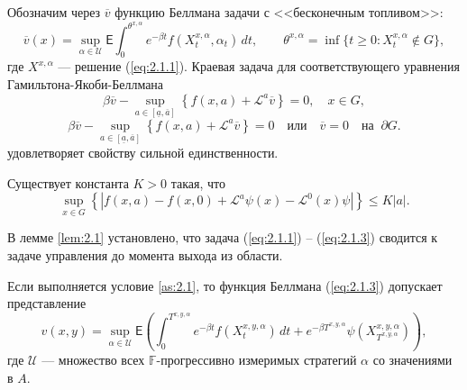 \begin{assumption} \label{as:2.2}
Обозначим через $\overline v$ функцию Беллмана задачи с <<бесконечным топливом>>:
\begin{equation} \label{eq:2.2.11}
\overline v(x)=\sup_{\alpha\in\mathcal U} \mathsf E\int_0^{\theta^{x,\alpha}} e^{-\beta t} f(X_t^{x,\alpha},\alpha_t)\,dt,
\qquad \theta^{x,\alpha}=\inf\{t\ge 0: X_t^{x,\alpha}\not \in G\},
\end{equation}
где $X^{x,\alpha}$ --- решение (\ref{eq:2.1.1}). Краевая задача для соответствующего уравнения Гамильтона-Якоби-Беллмана
\begin{equation} \label{eq:2.2.12}
\beta \overline v- \sup_{a \in [\underline a, \overline a]} \left\{f(x,a)+ \mathcal L^a \overline v \right\}=0,\quad x\in G,
\end{equation}
\begin{equation} \label{eq:2.2.13}
\beta \overline v- \sup_{a \in [\underline a, \overline a]} \left\{f(x,a)+ \mathcal L^a \overline v \right\}=0 \quad
\textrm{или}\quad \overline v=0\quad \textrm{на }\ \partial G.
\end{equation}
удовлетворяет свойству сильной единственности.
\end{assumption}
\begin{assumption} \label{as:2.3}
Существует константа $K>0$ такая, что
$$ \sup_{x\in G}\left\{|f(x,a)-f(x,0)+\mathcal L^a\psi(x)-\mathcal L^0(x)\psi|\right\}\le K|a|.$$
\end{assumption}
В лемме \ref{lem:2.1} установлено, что задача (\ref{eq:2.1.1}) -- (\ref{eq:2.1.3}) сводится к задаче управления до момента выхода из области.
\begin{lemma} \label{lem:2.1}
Если выполняется условие \ref{as:2.1}, то функция Беллмана (\ref{eq:2.1.3}) допускает представление
\begin{equation} \label{eq:2.2.6}
v(x,y)=\sup_{\alpha\in\mathcal U}\mathsf E\left(\int_0^{T^{x,y,\alpha}} e^{-\beta t} f(X_t^{x,y,\alpha})\,dt+e^{-\beta T^{x,y,\alpha}}\psi(X_{T^{x,y,\alpha}}^{x,y,\alpha})\right),
\end{equation}
где $\mathcal U$ --- множество всех $\mathbb F$-прогрессивно измеримых стратегий $\alpha$ со значениями в $A$.
\end{lemma}

